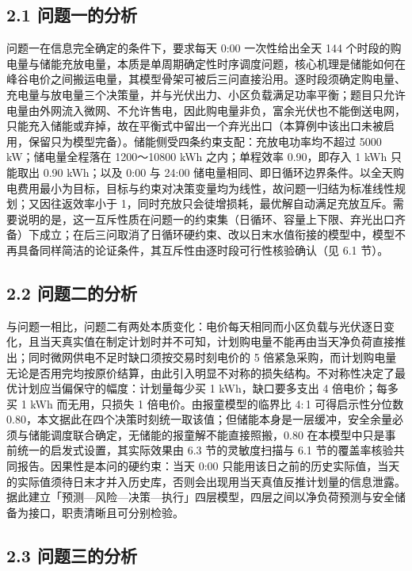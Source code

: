 \documentclass[12pt,a4paper]{ctexart}
\begin{document}
\subsection*{2.1 问题一的分析}

问题一在信息完全确定的条件下，要求每天 0:00 一次性给出全天 144 个时段的购电量与储能充放电量，本质是单周期确定性时序调度问题，核心机理是储能如何在峰谷电价之间搬运电量，其模型骨架可被后三问直接沿用。逐时段须确定购电量、充电量与放电量三个决策量，并与光伏出力、小区负载满足功率平衡；题目只允许电量由外网流入微网、不允许售电，因此购电量非负，富余光伏也不能倒送电网，只能充入储能或弃掉，故在平衡式中留出一个弃光出口（本算例中该出口未被启用，保留只为模型完备）。储能侧受四条约束支配：充放电功率均不超过 5000 kW；储电量全程落在 1200～10800 kWh 之内；单程效率 0.90，即存入 1 kWh 只能取出 0.90 kWh；以及 0:00 与 24:00 储电量相同、即日循环边界条件。以全天购电费用最小为目标，目标与约束对决策变量均为线性，故问题一归结为标准线性规划；又因往返效率小于 1，同时充放只会徒增损耗，最优解自动满足充放互斥。需要说明的是，这一互斥性质在问题一的约束集（日循环、容量上下限、弃光出口齐备）下成立；在后三问取消了日循环硬约束、改以日末水值衔接的模型中，模型不再具备同样简洁的论证条件，其互斥性由逐时段可行性核验确认（见 6.1 节）。

\subsection*{2.2 问题二的分析}

与问题一相比，问题二有两处本质变化：电价每天相同而小区负载与光伏逐日变化，且当天真实值在制定计划时并不可知，计划购电量不能再由当天净负荷直接推出；同时微网供电不足时缺口须按交易时刻电价的 5 倍紧急采购，而计划购电量无论是否用完均按原价结算，由此引入明显不对称的损失结构。不对称性决定了最优计划应当偏保守的幅度：计划量每少买 1 kWh，缺口要多支出 4 倍电价；每多买 1 kWh 而无用，只损失 1 倍电价。由报童模型的临界比 4$:$1 可得启示性分位数 0.80，本文据此在四个决策时刻统一取该值；但储能本身是一层缓冲，安全余量必须与储能调度联合确定，无储能的报童解不能直接照搬，0.80 在本模型中只是事前统一的启发式设置，其实际效果由 6.3 节的灵敏度扫描与 6.1 节的覆盖率核验共同报告。因果性是本问的硬约束：当天 0:00 只能用该日之前的历史实际值，当天的实际值须待日末才并入历史库，否则会出现用当天真值反推计划量的信息泄露。据此建立「预测—风险—决策—执行」四层模型，四层之间以净负荷预测与安全储备为接口，职责清晰且可分别检验。

\subsection*{2.3 问题三的分析}
\end{document}
